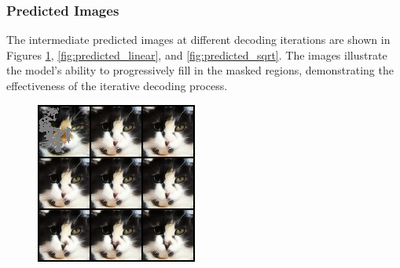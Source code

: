 \subsubsection{Predicted Images}


The intermediate predicted images at different decoding iterations are shown in Figures \ref{fig:predicted_cosine}, \ref{fig:predicted_linear}, and \ref{fig:predicted_sqrt}.
The images illustrate the model's ability to progressively fill in the masked regions, demonstrating the effectiveness of the iterative decoding process.

\begin{figure}[H]
    \begin{minipage}[t]{0.3\textwidth}
        \centering
        \includegraphics[width=\textwidth]{images/cosine_pred_test_0.png}
        \label{fig:predicted_cosine}
    \end{minipage}
    \hfill
    \begin{minipage}[t]{0.3\textwidth}
        \centering

\end{minipage}
\end{figure}
